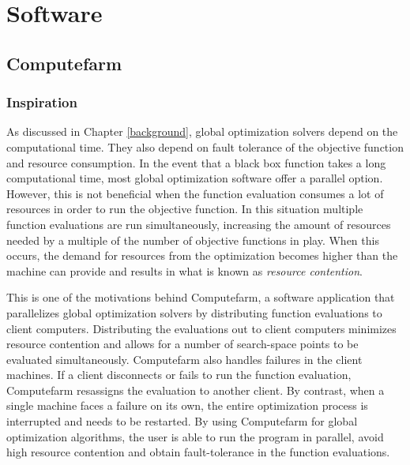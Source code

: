 \chapter{Software}
\label{methods}
\section{Computefarm}
\label{computefarm}
\subsection{Inspiration}
As discussed in Chapter \ref{background}, global optimization solvers depend on the computational time. They also depend on fault tolerance of the objective function and resource consumption. In the event that a black box function takes a long computational time, most global optimization software offer a parallel option. However, this is not beneficial when the function evaluation consumes a lot of resources in order to run the objective function. In this situation multiple function evaluations are run simultaneously, increasing the amount of resources needed by a multiple of the number of objective functions in play. When this occurs, the demand for resources from the optimization becomes higher than the machine can provide and results in what is known as \textit{resource contention}. 


This is one of the motivations behind Computefarm, a software application that parallelizes global optimization solvers by distributing function evaluations to client computers. Distributing the evaluations out to client computers minimizes resource contention and allows for a number of search-space points to be evaluated simultaneously. Computefarm also handles failures in the client machines. If a client disconnects or fails to run the function evaluation, Computefarm resassigns the evaluation to another client. By contrast, when a single machine faces a failure on its own, the entire optimization process is interrupted and needs to be restarted. By using Computefarm for global optimization algorithms, the user is able to run the program in parallel, avoid high resource contention and obtain fault-tolerance in the function evaluations.   
\clearpage 
